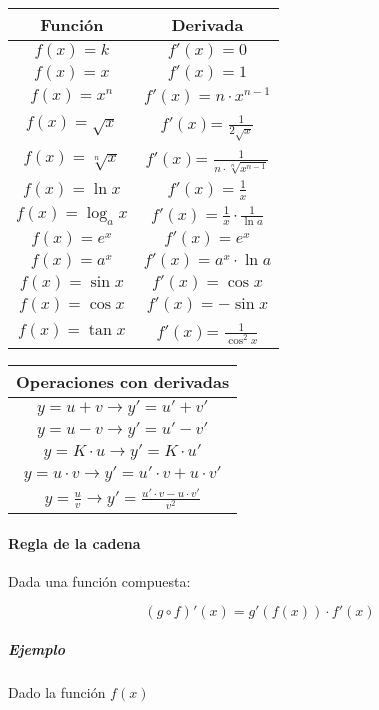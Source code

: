 \newpage


\begin{tabular}{|c|c|}\hline 
Función  & Derivada  \\ 
\hline
$f(x) = k$  & $f'(x) = 0$   \\ 
$f(x) = x$  &                     $f'(x)= 1$ \\
$f(x) = x^n$ &                    $f'(x)= n\cdot x^{n-1}$\\
$f(x) = \sqrt x $ &      $f'(x)$= $\frac{1}{{2\sqrt x }}$\\
$f(x) = \sqrt[n]{x}$  &     $f'(x)$= $\frac{1}{n\cdot\sqrt[n]{x^{n - 1}}}$\\
$f(x) = \ln{x}$ &                  $f'(x)= \frac{1}{x}$\\
$f(x) = \log_a x$ &              $f'(x)=\frac{1}{x}\cdot\frac{1}{\ln a}$\\
$f(x) = e^x$ &                     $f'(x)=e^x$\\
$f(x) = a^x$ &                     $f'(x)= a^x\cdot\ln a$\\
$f(x) = \sin x$ &               $f'(x)= \cos x$ \\
$f(x) = \cos x$  &              $f'(x)= -\sin x$\\
$f(x) = \tan x$ &                  $f'(x)$= $\frac{1}{{{{\cos }^2}x}}$\\
\hline

\end{tabular} 

\begin{tabular}{|c|}\hline 
Operaciones con derivadas  \\ 
\hline
$y=u + v \rightarrow y' = u' + v'$    \\ 
$y=u - v \rightarrow y' = u' - v'$    \\
$y=K\cdot u \rightarrow y' = K \cdot u'$    \\ 
$y=u \cdot v \rightarrow y' = u'\cdot v + u\cdot v'$    \\
$y= \frac{u}{v}  \rightarrow y' = \frac{u'\cdot v - u\cdot v'}{v^2}$    \\  
\hline

\end{tabular} 

\paragraph{Regla de la cadena} Dada una función compuesta: 

$$\left(g \circ f\right)'(x)=g'\left(f(x)\right)\cdot f'\left(x\right) $$  

\subparagraph{Ejemplo}

Dado la función $f(x)$

     




%
%
